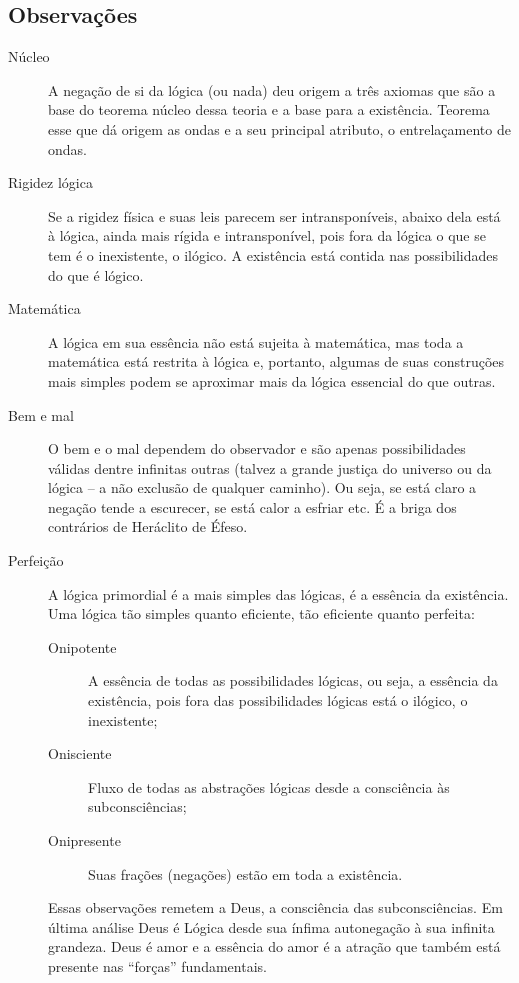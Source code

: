 \subsection{Observações}
	\begin{description}
	   \item[Núcleo] A negação de si da lógica (ou nada) deu origem a três axiomas que são a base do teorema núcleo dessa teoria e a base para a existência. Teorema esse que dá origem as ondas e a seu principal atributo, o entrelaçamento de ondas. 
	   \item[Rigidez lógica] Se a rigidez física e suas leis parecem ser intransponíveis, abaixo dela está à lógica, ainda mais rígida e intransponível, pois fora da lógica o que se tem é o inexistente, o ilógico. A existência está contida nas possibilidades do que é lógico. 
	   \item[Matemática] A lógica em sua essência não está sujeita à matemática, mas toda a matemática está restrita à lógica e, portanto, algumas de suas construções mais simples podem se aproximar mais da lógica essencial do que outras.
	   \item[Bem e mal] O bem e o mal dependem do observador e são apenas possibilidades válidas dentre infinitas outras (talvez a grande justiça do universo ou da lógica – a não exclusão de qualquer caminho). Ou seja, se está claro a negação tende a escurecer, se está calor a esfriar etc. É a briga dos contrários de Heráclito de Éfeso. 
	   \item[Perfeição] A lógica primordial é a mais simples das lógicas, é a essência da existência. Uma lógica tão simples quanto eficiente, tão eficiente quanto perfeita:
	   \begin{description}
		   \item[Onipotente] A essência de todas as possibilidades lógicas, ou seja, a essência da existência, pois fora das possibilidades lógicas está o ilógico, o inexistente;
		   \item[Onisciente] Fluxo de todas as abstrações lógicas desde a consciência às subconsciências; 
		   \item[Onipresente] Suas frações (negações) estão em toda a existência.
	   \end{description}
	Essas observações remetem a Deus, a consciência das subconsciências. Em última análise Deus é Lógica desde sua ínfima autonegação à sua infinita grandeza. Deus é amor e a essência do amor é a atração que também está presente nas “forças” fundamentais.

\end{description}
